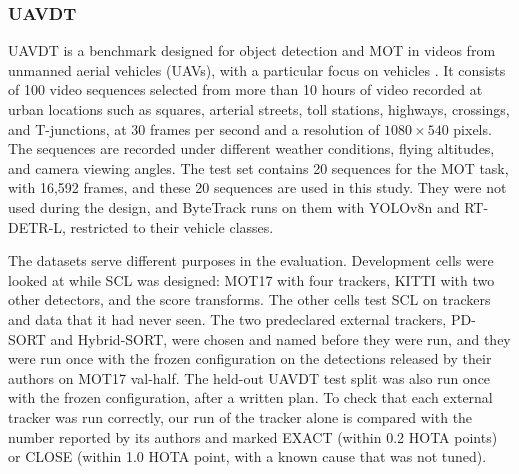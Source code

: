 \documentclass[pdflatex,sn-mathphys-num,iicol]{sn-jnl}
\newcommand{\scl}{SCL}
\begin{document}
\subsubsection{UAVDT}
UAVDT is a benchmark designed for object detection and MOT in videos from unmanned aerial
vehicles (UAVs), with a particular focus on vehicles \cite{du2018uavdt}. It consists of 100 video
sequences selected from more than 10 hours of video recorded at urban locations such as squares,
arterial streets, toll stations, highways, crossings, and T-junctions, at 30 frames per second and
a resolution of $1080\times540$ pixels. The sequences are recorded under different weather
conditions, flying altitudes, and camera viewing angles. The test set contains 20 sequences for the
MOT task, with 16,592 frames, and these 20 sequences are used in this study. They were not used
during the design, and ByteTrack runs on them with YOLOv8n and RT-DETR-L, restricted to their
vehicle classes.

The datasets serve different purposes in the evaluation. Development cells were looked at while
\scl{} was designed: MOT17 with four trackers, KITTI with two other detectors, and the score
transforms. The other cells test \scl{} on trackers and data that it had never seen. The two
predeclared external trackers, PD-SORT and Hybrid-SORT, were chosen and named before they were
run, and they were run once with the frozen configuration on the detections released by their
authors on MOT17 val-half. The held-out UAVDT test split was also run once with the frozen
configuration, after a written plan. To check that each external tracker was run correctly, our run
of the tracker alone is compared with the number reported by its authors and marked EXACT (within
0.2 HOTA points) or CLOSE (within 1.0 HOTA point, with a known cause that was not tuned).
\end{document}
